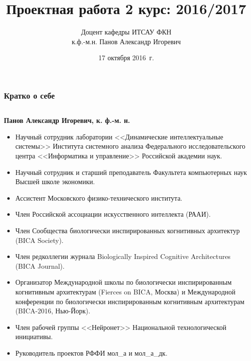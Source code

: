 \documentclass[default]{beamer}
\begin{document}
	
	\title[Проекты для 2 курса]{Проектная работа 2 курс: 2016/2017}
	\author[Панов А.И.]{Доцент кафедры ИТСАУ ФКН\\к.ф.-м.н. Панов Александр Игоревич}

	\date{17 октября 2016~г.} 
	
	\begin{frame}
		\titlepage
	\end{frame}

	\begin{frame}
	\frametitle{Кратко о себе}
	\scriptsize
	\begin{columns}
		\begin{column}{0.85\textwidth}
			\textbf{Панов Александр Игоревич, к. ф.-м. н.}
			\begin{itemize}
				\item Научный сотрудник лаборатории <<Динамические интеллектуальные системы>> Института системного анализа Федерального исследовательского центра <<Информатика и управление>> Российской академии наук.
				\item Научный сотрудник и старший преподаватель Факультета компьютерных наук Высшей школе экономики.
				\item Ассистент Московского физико-технического института.
				\item Член Российской ассоциации искусственного интеллекта (РААИ).
				\item Член Сообщества биологически инспирированных когнитивных архитектур (BICA Society).
				\item Член редколлегии журнала Biologically Inspired Cognitive Architectures (BICA Journal).
				\item Организатор Международной	школы по биологически инспирированным когнитивным архитектурам (Fierces on BICA, Москва) и Международной конференции по биологически инспирированным когнитивным архитектурам (BICA-2016, Нью-Йорк).
				\item Член рабочей группы <<Нейронет>> Национальной технологической инициативы.
				\item Руководитель проектов РФФИ мол\_а и мол\_а\_дк.
			\end{itemize}
		\end{column}
		

\end{columns}
\end{frame}
\end{document}
